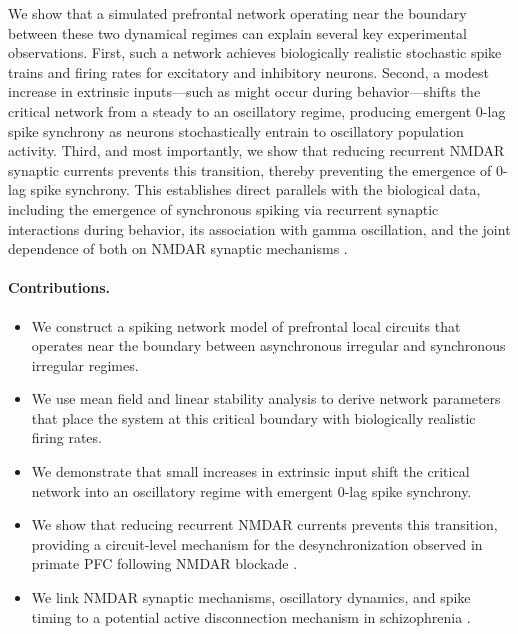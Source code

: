 \documentclass[10pt]{article}
\begin{document}
We show that a simulated prefrontal network operating near the boundary between
these two dynamical regimes can explain several key experimental observations.
First, such a network achieves biologically realistic stochastic spike trains
and firing rates for excitatory and inhibitory neurons. Second, a modest
increase in extrinsic inputs---such as might occur during behavior---shifts
the critical network from a steady to an oscillatory regime, producing emergent
0-lag spike synchrony as neurons stochastically entrain to oscillatory
population activity. Third, and most importantly, we show that reducing
recurrent NMDAR synaptic currents prevents this transition, thereby preventing
the emergence of 0-lag spike synchrony. This establishes direct parallels with
the biological data, including the emergence of synchronous spiking via
recurrent synaptic interactions during behavior, its association with gamma
oscillation, and the joint dependence of both on NMDAR synaptic mechanisms
\citep{zick2018blocking}.

\paragraph{Contributions.}
\begin{itemize}
  \item We construct a spiking network model of prefrontal local circuits that
    operates near the boundary between asynchronous irregular and synchronous
    irregular regimes.
  \item We use mean field and linear stability analysis to derive network
    parameters that place the system at this critical boundary with
    biologically realistic firing rates.
  \item We demonstrate that small increases in extrinsic input shift the
    critical network into an oscillatory regime with emergent 0-lag spike
    synchrony.
  \item We show that reducing recurrent NMDAR currents prevents this
    transition, providing a circuit-level mechanism for the desynchronization
    observed in primate PFC following NMDAR blockade \citep{zick2018blocking}.
  \item We link NMDAR synaptic mechanisms, oscillatory dynamics, and spike
    timing to a potential active disconnection mechanism in schizophrenia
    \citep{dan2004spike, zick2021disparate}.
\end{itemize}

\end{document}
